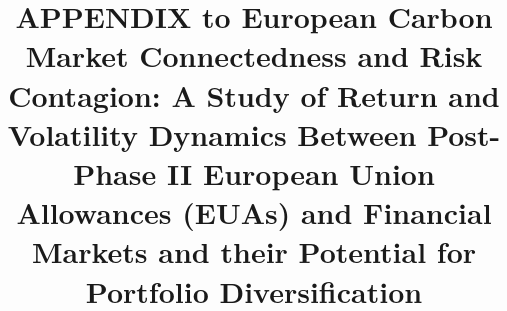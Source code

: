 \documentclass[preprint, 3p,
authoryear]{elsarticle} %
\begin{document}
\begin{frontmatter}

  \title{APPENDIX to European Carbon Market Connectedness and Risk
Contagion: A Study of Return and Volatility Dynamics Between Post-Phase
II European Union Allowances (EUAs) and Financial Markets and their
Potential for Portfolio Diversification}
  
  \begin{abstract}
  
  \end{abstract}
  
 \end{frontmatter}

\newpage

\appendix

\begin{landscape}

\end{landscape}
\end{document}
